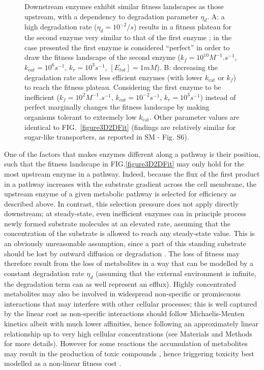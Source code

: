 \documentclass[nogrid,crop,final]{MBE2}%
\newcommand{\othercaption}[1]{\caption{\setlength{\baselineskip}{1.5\baselineskip}#1}}
\begin{document}
\begin{figure}[t!]
\begin{minipage}[c]{0.48\linewidth}
\end{minipage}
\othercaption{Downstream enzymes exhibit similar fitness landscapes as those upstream, with a dependency to degradation parameter $\eta_d$. A: a high degradation rate ($\eta_d=10^{-2} /s$) results in a fitness plateau for the second enzyme very similar to that of the first enzyme ; in the case presented the first enzyme is considered ``perfect'' in order to draw the fitness landscape of the second enzyme ($k_f=10^{10}M^{-1}.s^{-1}$, $k_{cat}=10^6s^{-1}$, $k_r=10^3s^{-1}$, $[E_{tot}]=1mM$). B: decreasing the degradation rate allows less efficient enzymes (with lower $k_\text{cat}$ or $k_f$) to reach the fitness plateau. Considering the first enzyme to be inefficient ($k_f=10^{2}M^{-1}.s^{-1}$, $k_{cat}=10^{-2}s^{-1}$, $k_r=10^3s^{-1}$) instead of perfect marginally changes the fitness landscape by making organisms tolerant to extremely low $k_\text{cat}$. Other parameter values are identical to FIG.~\ref{figure3D2DFit} (findings are relatively similar for sugar-like transporters, as reported in SM - Fig. S6).}
\label{figure2D_2Enz_Deg}
\end{figure}

One of the factors that makes enzymes different along a pathway is their position, such that the fitness landscape in FIG.\ref{figure3D2DFit} may only hold for the most upstream enzyme in a pathway. Indeed, because the flux of the first product in a pathway increases with the substrate gradient across the cell membrane, the upstream enzyme of a given metabolic pathway is selected for efficiency as described above. In contrast, this selection pressure does not apply directly downstream; at steady-state, even inefficient enzymes can in principle process newly formed substrate molecules at an elevated rate, assuming that the concentration of the substrate is allowed to reach any steady-state value. This is an obviously unreasonable assumption, since a part of this standing substrate should be lost by outward diffusion or degradation \citep{Jones15,Bosdriesz18}. The loss of fitness may therefore result from the loss of metabolites in a way that can be modelled by a constant degradation rate $\eta_{d}$ \citep{Chou14} (assuming that the external environment is infinite, the degradation term can as well represent an efflux). Highly concentrated metabolites may also be involved in widespread non-specific \citep{Keller15} or promiscuous interactions \citep{Khersonsky10,Schauble13,Peracchi18} that may interfere with other cellular processes; this is well captured by the linear cost as non-specific interactions should follow Michaelis-Menten kinetics albeit with much lower affinities, hence following an approximately linear relationship up to very high cellular concentrations (see Materials and Methods for more details). However for some reactions the accumulation of metabolites may result in the production of toxic compounds \citep{Lilja17, Niehaus20}, hence triggering toxicity best modelled as a non-linear fitness cost \citep{Clark91,Wright10}.
\end{document}

